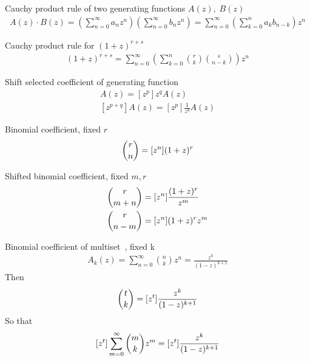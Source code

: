 ﻿\begin{identity}
    Cauchy product rule of two generating functions $A(z), \; B(z)$
    \begin{align*}
        A(z) \cdot B(z) = \left( \sum_{n=0}^{\infty} a_n z^n \right) \left( \sum_{n=0}^{\infty} b_n z^n \right)
        = \sum_{n=0}^{\infty} \left( \sum_{k=0}^{n} a_k b_{n-k} \right) z^n
    \end{align*}
\end{identity}
\begin{identity}
    Cauchy product rule for $(1+z)^{r+s}$
    \begin{align*}
    (1 + z)
        ^{r+s} = \sum_{n=0}^{\infty} \left( \sum_{k=0}^{n} \binom{r}{k} \binom{s}{n-k} \right) z^n
    \end{align*}
\end{identity}
\begin{identity}
    Shift selected coefficient of generating function
    \begin{align*}
    [z^{p-q}]
        A(z)=[z^p] z^{q} A(z) \\
        [z^{p+q}] A(z)=[z^p] \frac{1}{z^{q}} A(z)
    \end{align*}
\end{identity}
\begin{identity}
    Binomial coefficient, fixed $r$
    \begin{align*}
        \binom{r}{n} = [z^{n}] (1+z)^r
    \end{align*}
\end{identity}
\begin{identity}
    Shifted binomial coefficient, fixed $m, r$
    \begin{align*}
        \binom{r}{m+n} &= [z^{n}] \frac{(1+z)^r}{z^m} \\
        \binom{r}{n-m} &= [z^{n}] (1+z)^r z^m \\
    \end{align*}
\end{identity}
\begin{identity}
    Binomial coefficient of multiset~\cite[eq. 8]{faris2011generating}, fixed k
    \begin{align*}
        A_k(z) = \sum_{n=0}^{\infty} \binom{n}{k} z^n = \frac{z^k}{(1-z)^{k+1}}
    \end{align*}
    Then
    \begin{align*}
        \binom{t}{k} = [z^{t}] \frac{z^k}{(1-z)^{k+1}}
    \end{align*}
    So that
    \begin{align*}
        [z^{t}] \sum_{m=0}^{\infty} \binom{m}{k} z^m = [z^{t}] \frac{z^k}{(1-z)^{k+1}}
    \end{align*}
\end{identity}

